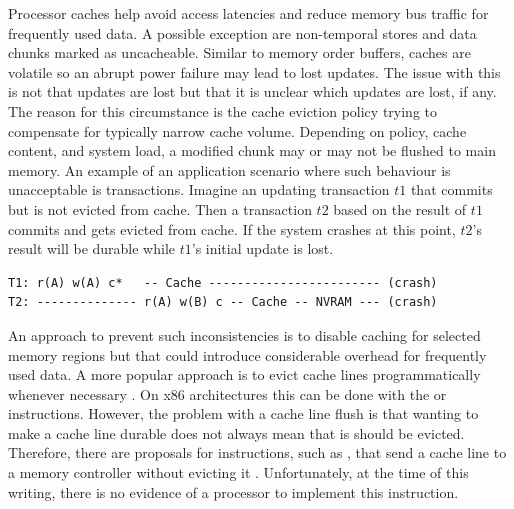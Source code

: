 
Processor caches help avoid access latencies and reduce memory bus traffic for
frequently used data. A possible exception are non-temporal stores and data
chunks marked as uncacheable. Similar to memory order buffers, caches are
volatile so an abrupt power failure may lead to lost updates. The issue with
this is not that updates are lost but that it is unclear which updates are lost,
if any. The reason for this circumstance is the cache eviction policy trying to
compensate for typically narrow cache volume. Depending on policy, cache
content, and system load, a modified chunk may or may not be flushed to main
memory. An example of an application scenario where such behaviour is
unacceptable is transactions. Imagine an updating transaction $t1$ that commits
but is not evicted from cache. Then a transaction $t2$ based on the result of
$t1$ commits and gets evicted from cache. If the system crashes at this point,
$t2$'s result will be durable while $t1$'s initial update is lost.


\begin{lstlisting}
T1: r(A) w(A) c*   -- Cache ------------------------ (crash)
T2: -------------- r(A) w(B) c -- Cache -- NVRAM --- (crash)
\end{lstlisting}

An approach to prevent such inconsistencies is to disable caching for selected
memory regions but that could introduce considerable overhead for frequently
used data. A more popular approach is to evict cache lines programmatically
whenever necessary \cite{condit2009better, dulloor2014system, oukid2017data}. On
x86 architectures this can be done with the  or 
instructions. However, the problem with a cache line flush is that wanting to
make a cache line durable does not always mean that is should be evicted.
Therefore, there are proposals for instructions, such as , that send
a cache line to a memory controller without evicting it \cite{kolli2016high,
oukid2017data}. Unfortunately, at the time of this writing, there is no evidence
of a processor to implement this instruction.


